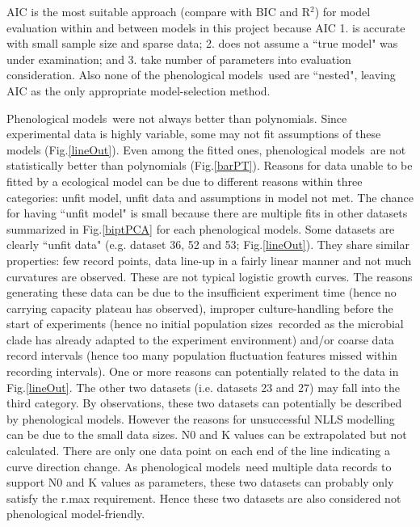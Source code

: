 \documentclass[a4paper, 11pt]{article}
\newcommand{\pml}{phenological model}
\newcommand{\pms}{phenological models}
\newcommand{\Pms}{Phenological models}
\newcommand{\pps}{population sizes}
\begin{document}
	AIC is the most suitable approach (compare with BIC and R$^2$) for model evaluation within and between models in this project because AIC 1. is accurate with small sample size\autocite{acquah2010comparison,kuha2004aic} and sparse data\autocite{kuha2004aic}; 2. does not assume a ``true model" was under examination\autocite{aho2014model,vrieze2012model,yang2005can}; and 3. take number of parameters into evaluation consideration\autocite{johnson2004model}.  Also none of the \pms\ used are ``nested"\autocite{wang2006comparison}, leaving AIC as the only appropriate model-selection method.
	
	\Pms\ were not always better than polynomials.  Since experimental data is highly variable, some may not fit assumptions of these models (Fig.\ref{lineOut}).  Even among the fitted ones, \pms\ are not statistically better than polynomials (Fig.\ref{barPT}).  Reasons for data unable to be fitted by a ecological model can be due to different reasons within three categories: unfit model, unfit data and assumptions in model not met.  The chance for having ``unfit model" is small because there are multiple fits in other datasets summarized in Fig.\ref{biptPCA} for each \pms.  Some datasets are clearly ``unfit data" (e.g. dataset 36, 52 and 53; Fig.\ref{lineOut}).  They share similar properties: few record points, data line-up in a fairly linear manner and not much curvatures are observed.  These are not typical logistic growth curves.  The reasons generating these data can be due to the insufficient experiment time (hence no carrying capacity plateau has observed), improper culture-handling before the start of experiments (hence no initial \pps\ recorded as the microbial clade has already adapted to the experiment environment) and/or coarse data record intervals (hence too many population fluctuation features missed within recording intervals).  One or more reasons can potentially related to the data in Fig.\ref{lineOut}.  The other two datasets (i.e. datasets 23 and 27) may fall into the third category.  By observations, these two datasets can potentially be described by \pms.  However the reasons for unsuccessful NLLS modelling can be due to the small data sizes.  N0 and K values can be extrapolated but not calculated.  There are only one data point on each end of the line indicating a curve direction change.  As \pms\ need multiple data records to support N0 and K values as parameters, these two datasets can probably only satisfy the r.max requirement.  Hence these two datasets are also considered not \pml-friendly.
	
\end{document}
